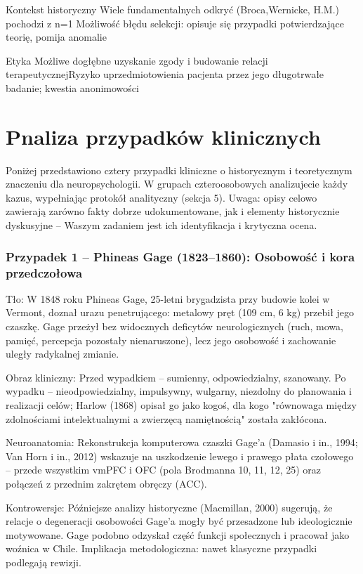 \documentclass[11pt,a4paper]{article}
\begin{document}
Kontekst historyczny
Wiele fundamentalnych odkryć (Broca,Wernicke, H.M.) pochodzi z n=1
Możliwość błędu selekcji: opisuje się przypadki potwierdzające teorię, pomija anomalie

Etyka
Możliwe dogłębne uzyskanie zgody i budowanie relacji terapeutycznejRyzyko uprzedmiotowienia pacjenta przez jego długotrwałe badanie; kwestia anonimowości


\section{Pnaliza przypadków klinicznych}
Poniżej przedstawiono cztery przypadki kliniczne o historycznym i teoretycznym znaczeniu dla
neuropsychologii. W grupach czteroosobowych analizujecie każdy kazus, wypełniając protokół analityczny
(sekcja 5). Uwaga: opisy celowo zawierają zarówno fakty dobrze udokumentowane, jak i elementy historycznie
dyskusyjne – Waszym zadaniem jest ich identyfikacja i krytyczna ocena.

\subsubsection*{Przypadek 1 – Phineas Gage (1823–1860): Osobowość i kora przedczołowa}
Tło: W 1848 roku Phineas Gage, 25-letni brygadzista przy budowie kolei w Vermont, doznał urazu penetrującego:
metalowy pręt (109 cm, 6 kg) przebił jego czaszkę. Gage przeżył bez widocznych deficytów neurologicznych (ruch,
mowa, pamięć, percepcja pozostały nienaruszone), lecz jego osobowość i zachowanie uległy radykalnej zmianie.

Obraz kliniczny: Przed wypadkiem – sumienny, odpowiedzialny, szanowany. Po wypadku – nieodpowiedzialny,
impulsywny, wulgarny, niezdolny do planowania i realizacji celów; Harlow (1868) opisał go jako kogoś, dla kogo
"równowaga między zdolnościami intelektualnymi a zwierzęcą namiętnością" została zakłócona.

Neuroanatomia: Rekonstrukcja komputerowa czaszki Gage'a (Damasio i in., 1994; Van Horn i in., 2012) wskazuje na
uszkodzenie lewego i prawego płata czołowego – przede wszystkim vmPFC i OFC (pola Brodmanna 10, 11, 12, 25)
oraz połączeń z przednim zakrętem obręczy (ACC).

Kontrowersje: Późniejsze analizy historyczne (Macmillan, 2000) sugerują, że relacje o degeneracji osobowości Gage'a
mogły być przesadzone lub ideologicznie motywowane. Gage podobno odzyskał część funkcji społecznych i pracował
jako woźnica w Chile. Implikacja metodologiczna: nawet klasyczne przypadki podlegają rewizji.
\end{document}
